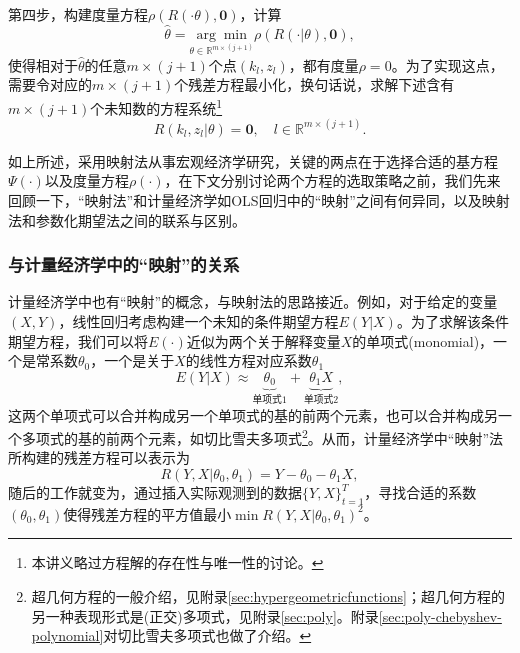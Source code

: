 第四步，构建度量方程$\rho \left(R(\cdot \theta), \bm{0} \right)$，计算
\begin{equation*}
\hat{\theta} = \underset{\theta \in \mathbb{R}^{m \times (j+1)}}{\arg \min} \rho \left(R(\cdot | \theta), \bm{0} \right),
\end{equation*}
使得相对于$\hat{\theta}$的任意$m \times (j+1)$个点$(k_l, z_l)$，都有度量$\rho =0$。为了实现这点，需要令对应的$m \times (j+1)$个残差方程最小化，换句话说，求解下述含有$m \times (j+1)$个未知数的方程系统\footnote{本讲义略过方程解的存在性与唯一性的讨论。}
\begin{equation*}
  R\left( k_l, z_l | \theta \right) = \bm{0}, \quad l \in \mathbb{R}^{m \times (j+1)}.
\end{equation*}

如上所述，采用映射法从事宏观经济学研究，关键的两点在于选择合适的基方程$\Psi(\cdot)$以及度量方程$\rho(\cdot)$，在下文分别讨论两个方程的选取策略之前，我们先来回顾一下，``映射法''和计量经济学如OLS回归中的``映射''之间有何异同，以及映射法和参数化期望法之间的联系与区别。

\subsubsection{与计量经济学中的``映射''的关系}
\label{sec:pj-connection-ols-econometrics}
计量经济学中也有``映射''的概念，与映射法的思路接近。例如，对于给定的变量$(X,Y)$，线性回归考虑构建一个未知的条件期望方程$E(Y | X)$。为了求解该条件期望方程，我们可以将$E(\cdot)$近似为两个关于解释变量$X$的单项式(monomial)，一个是常系数$\theta_0$，一个是关于$X$的线性方程对应系数$\theta_1$
\begin{equation*}
  E(Y|X) \approx \underbrace{\theta_0}_{\text{单项式1}} + \underbrace{\theta_1 X}_{\text{单项式2}},
\end{equation*}
这两个单项式可以合并构成另一个单项式的基的前两个元素，也可以合并构成另一个多项式的基的前两个元素，如切比雪夫多项式\footnote{超几何方程的一般介绍，见附录\ref{sec:hypergeometricfunctions}；超几何方程的另一种表现形式是(正交)多项式，见附录\ref{sec:poly}。附录\ref{sec:poly-chebyshev-polynomial}对切比雪夫多项式也做了介绍。}。从而，计量经济学中``映射''法所构建的残差方程可以表示为
\begin{equation*}
  R(Y,X| \theta_0, \theta_1) = Y - \theta_0 - \theta_1 X,
\end{equation*}
随后的工作就变为，通过插入实际观测到的数据$\{Y, X \}_{t=1}^{T}$，寻找合适的系数$(\theta_0, \theta_1)$使得残差方程的平方值最小$\min R(Y,X| \theta_0, \theta_1)^2$。

